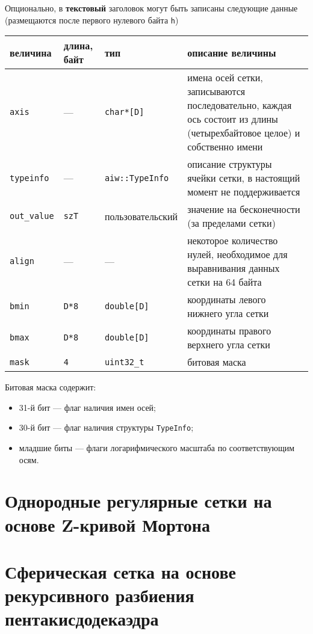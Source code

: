 \documentclass[12pt]{article}
\begin{document}
Опционально, в {\bf текстовый} заголовок могут быть записаны следующие данные (размещаются после первого нулевого байта {\tt h})
\begin{center}
\begin{tabular}{|p{}|p{}|p{}|p{}|}
\hline
величина & длина, байт & тип & описание величины \\
\hline
  {\tt axis} & --- & {\tt char*[D]} & имена осей сетки, записываются последовательно, каждая ось состоит из длины (четырехбайтовое целое) и собственно имени\\
  {\tt typeinfo} & --- & {\tt aiw::TypeInfo} & описание структуры ячейки сетки, в настоящий момент не поддерживается \\
  {\tt out\_value} & {\tt szT} & пользовательский & значение на бесконечности (за пределами сетки) \\
  {\tt align} & --- & --- & некоторое количество нулей, необходимое для выравнивания данных сетки на 64 байта \\
  {\tt bmin} & {\tt D*8} & {\tt double[D]} & координаты левого нижнего угла сетки \\
  {\tt bmax} & {\tt D*8} & {\tt double[D]} & координаты правого верхнего угла сетки \\
  {\tt mask} & {\tt 4} & {\tt uint32\_t} & битовая маска \\  
  \hline
\end{tabular}
\end{center}
Битовая маска содержит:
\begin{itemize}
  \item 31-й бит --- флаг наличия имен осей;
  \item 30-й бит --- флаг наличия структуры {\tt TypeInfo};
  \item младшие биты --- флаги логарифмического масштаба по соответствующим осям.
\end{itemize}


\section{Однородные регулярные сетки на основе Z-кривой Мортона}
\section{Сферическая сетка на основе рекурсивного разбиения пентакисдодекаэдра}
\end{document}
